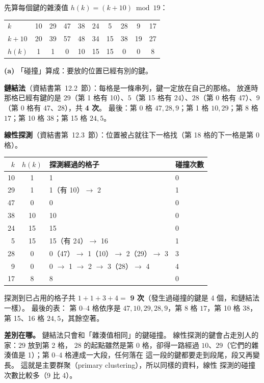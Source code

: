 \begin{pastsoln}
先算每個鍵的雜湊值 $h(k) = (k + 10) \bmod 19$：
\begin{center}
\small
\begin{tabular}{l*{9}{c}}
\toprule
$k$ & 10 & 29 & 47 & 38 & 24 & 5 & 28 & 9 & 17 \\
$k + 10$ & 20 & 39 & 57 & 48 & 34 & 15 & 38 & 19 & 27 \\
$h(k)$ & 1 & 1 & 0 & 10 & 15 & 15 & 0 & 0 & 8 \\
\bottomrule
\end{tabular}
\end{center}

\textbf{(a)} 「碰撞」算成：要放的位置已經有別的鍵。

\textbf{鏈結法}（資結書第~12.2~節）：每格是一條串列，鍵一定放在自己的那格。 放進時那格已經有鍵的是
$29$（第 1 格有 10）、$5$（第 15 格有 24）、$28$（第 0 格有 47）、$9$（第 0 格有 47、28），共 \textbf{4 次}。
最後：第 0 格 $47, 28, 9$；第 1 格 $10, 29$；第 8 格 $17$；第 10 格 $38$；第 15 格 $24, 5$。

\textbf{線性探測}（資結書第~12.3~節）：位置被占就往下一格找（第 18 格的下一格是第 0 格）。
\begin{center}
\small
\begin{tabular}{rcll}
\toprule
$k$ & $h(k)$ & 探測經過的格子 & 碰撞次數 \\
\midrule
10 & 1 & 1 & 0 \\
29 & 1 & 1（有 10）$\to$ 2 & 1 \\
47 & 0 & 0 & 0 \\
38 & 10 & 10 & 0 \\
24 & 15 & 15 & 0 \\
5 & 15 & 15（有 24）$\to$ 16 & 1 \\
28 & 0 & 0（47）$\to$ 1（10）$\to$ 2（29）$\to$ 3 & 3 \\
9 & 0 & 0 $\to$ 1 $\to$ 2 $\to$ 3（28）$\to$ 4 & 4 \\
17 & 8 & 8 & 0 \\
\bottomrule
\end{tabular}
\end{center}
探測到已占用的格子共 $1 + 1 + 3 + 4 =$ \textbf{9 次}（發生過碰撞的鍵是 4 個，和鏈結法一樣）。 最後的表：
第 0--4 格依序是 $47, 10, 29, 28, 9$，第 8 格 $17$，第 10 格 $38$，第 15、16 格 $24, 5$，其餘空著。

\textbf{差別在哪。} 鏈結法只會和「雜湊值相同」的鍵碰撞。 線性探測的鍵會占走別人的家：$29$ 放到第 2 格，
$28$ 的起點雖然是第 0 格，卻得一路經過 $10$、$29$（它們的雜湊值是 1）；第 0--4 格連成一大段，任何落在
這一段的鍵都要走到段尾，段又再變長。 這就是主要群聚（primary clustering），所以同樣的資料，線性
探測的碰撞次數比較多（9 比 4）。


\end{pastsoln}
